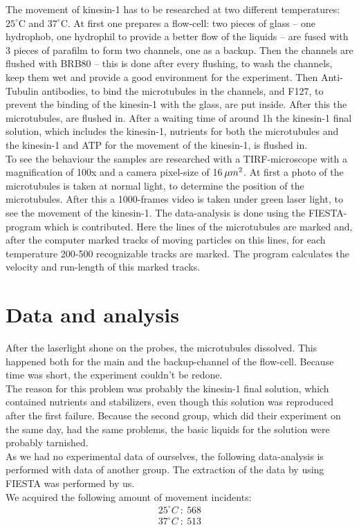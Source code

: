 \documentclass[english, %
parskip=full, %
bibliography=totoc, %
]{scrartcl}
\begin{document}
The movement of kinesin-1 has to be researched at two different temperatures: $25^\circ\text{C}$ and $37^\circ\text{C}$.
At first one prepares a flow-cell: two pieces of glass – one hydrophob, one hydrophil to provide a better flow of the liquids – are fused with 3 pieces of parafilm to form two channels, one as a backup. Then the channels are flushed with BRB80 – this is done after every flushing, to wash the channels, keep them wet and provide a good environment for the experiment. Then Anti-Tubulin antibodies, to bind the microtubules in the channels, and F127, to prevent the binding of the kinesin-1 with the glass, are put inside. After this the microtubules, are flushed in. After a waiting time of around 1h the kinesin-1 final solution, which includes the kinesin-1, nutrients for both the microtubules and the kinesin-1 and ATP for the movement of the kinesin-1, is flushed in.\\
To see the behaviour the samples are researched with a TIRF-microscope with a magnification of 100x and a camera pixel-size of 16\,$\mu m\textsuperscript{2}$. At first a photo of the microtubules is taken at normal light, to determine the position of the microtubules. After this a 1000-frames video is taken under green laser light, to see the movement of the kinesin-1. The data-analysis is done using the FIESTA-program which is contributed. Here the lines of the microtubules are marked and, after the computer marked tracks of moving particles on this lines, for each temperature 200-500 recognizable tracks are marked. The program calculates the velocity and run-length of this marked tracks.

\section{Data and analysis}

After the laserlight shone on the probes, the microtubules dissolved. This happened both for the main and the backup-channel of the flow-cell. Because time was short, the experiment couldn't be redone.\\
The reason for this problem was probably the kinesin-1 final solution, which contained nutrients and stabilizers, even though this solution was reproduced after the first failure. Because the second group, which did their experiment on the same day, had the same problems, the basic liquids for the solution were probably tarnished. \\
As we had no experimental data of ourselves, the following data-analysis is performed with data of another group. The extraction of the data by using FIESTA was performed by us. \\
We acquired the following amount of movement incidents: 
\begin{align*}
25^\circ C \ : \ 568 \\
37^\circ C \ : \ 513
\end{align*}
\end{document}
